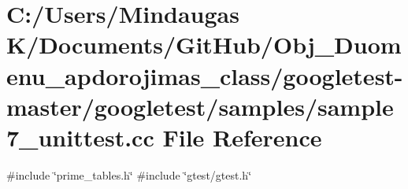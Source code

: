 \hypertarget{googletest-master_2googletest_2samples_2sample7__unittest_8cc}{}\section{C\+:/\+Users/\+Mindaugas K/\+Documents/\+Git\+Hub/\+Obj\+\_\+\+Duomenu\+\_\+apdorojimas\+\_\+class/googletest-\/master/googletest/samples/sample7\+\_\+unittest.cc File Reference}
\label{googletest-master_2googletest_2samples_2sample7__unittest_8cc}
{\ttfamily \#include \char`\"{}prime\+\_\+tables.\+h\char`\"{}}\newline
{\ttfamily \#include \char`\"{}gtest/gtest.\+h\char`\"{}}\newline
